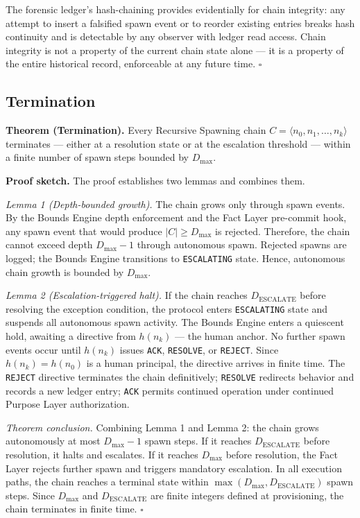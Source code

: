\medskip
The forensic ledger's hash-chaining provides evidentially for chain integrity: any attempt to insert a falsified spawn event or to reorder existing entries breaks hash continuity and is detectable by any observer with ledger read access. Chain integrity is not a property of the current chain state alone — it is a property of the entire historical record, enforceable at any future time. $\square$

\subsection{Termination}
\label{sec:rs-termination-proof}

\medskip
\noindent\textbf{Theorem (Termination).} Every Recursive Spawning chain $C = \langle n_0, n_1, \ldots, n_k \rangle$ terminates — either at a resolution state or at the escalation threshold — within a finite number of spawn steps bounded by $D_{\text{max}}$.

\medskip
\noindent\textbf{Proof sketch.} The proof establishes two lemmas and combines them.

\medskip
\textit{Lemma 1 (Depth-bounded growth).} The chain grows only through spawn events. By the Bounds Engine depth enforcement and the Fact Layer pre-commit hook, any spawn event that would produce $|C| \geq D_{\text{max}}$ is rejected. Therefore, the chain cannot exceed depth $D_{\text{max}} - 1$ through autonomous spawn. Rejected spawns are logged; the Bounds Engine transitions to \texttt{ESCALATING} state. Hence, autonomous chain growth is bounded by $D_{\text{max}}$.

\medskip
\textit{Lemma 2 (Escalation-triggered halt).} If the chain reaches $D_{\text{ESCALATE}}$ before resolving the exception condition, the protocol enters \texttt{ESCALATING} state and suspends all autonomous spawn activity. The Bounds Engine enters a quiescent hold, awaiting a directive from $h(n_k)$ — the human anchor. No further spawn events occur until $h(n_k)$ issues \texttt{ACK}, \texttt{RESOLVE}, or \texttt{REJECT}. Since $h(n_k) = h(n_0)$ is a human principal, the directive arrives in finite time. The \texttt{REJECT} directive terminates the chain definitively; \texttt{RESOLVE} redirects behavior and records a new ledger entry; \texttt{ACK} permits continued operation under continued Purpose Layer authorization.

\medskip
\textit{Theorem conclusion.} Combining Lemma 1 and Lemma 2: the chain grows autonomously at most $D_{\text{max}} - 1$ spawn steps. If it reaches $D_{\text{ESCALATE}}$ before resolution, it halts and escalates. If it reaches $D_{\text{max}}$ before resolution, the Fact Layer rejects further spawn and triggers mandatory escalation. In all execution paths, the chain reaches a terminal state within $\max(D_{\text{max}}, D_{\text{ESCALATE}})$ spawn steps. Since $D_{\text{max}}$ and $D_{\text{ESCALATE}}$ are finite integers defined at provisioning, the chain terminates in finite time. $\square$


